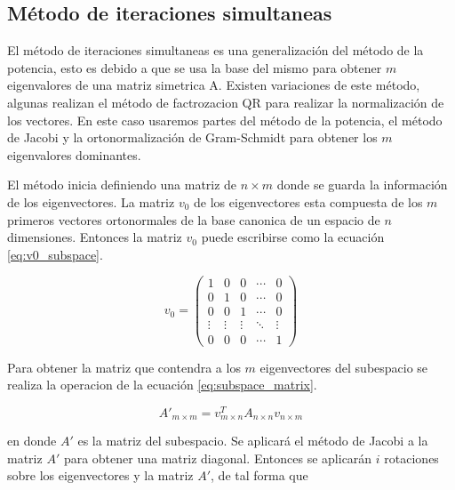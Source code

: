 \subsection{Método de iteraciones simultaneas}

El método de iteraciones simultaneas es una generalización del método de la potencia, esto es debido a que se usa la base del mismo para obtener $m$ eigenvalores de una matriz simetrica A. Existen variaciones de este método, algunas realizan el método de factrozacion QR para realizar la normalización de los vectores. En este caso usaremos partes del método de la potencia, el método de Jacobi y la ortonormalización de Gram-Schmidt para obtener los $m$ eigenvalores dominantes.

El método inicia definiendo una matriz de $n\times m$ donde se guarda la información de los eigenvectores. La matriz $v_0$ de los eigenvectores esta compuesta de los $m$ primeros vectores ortonormales de la base canonica de un espacio de $n$ dimensiones. Entonces la matriz $v_0$ puede escribirse como la ecuación \ref{eq:v0_subspace}.

\begin{equation}
    v_0 = \begin{pmatrix}
        1      & 0      & 0      & \cdots & 0                        \\
        0      & 1      & 0      & \cdots & 0                        \\
        0      & 0      & 1      & \cdots & 0                        \\
        \vdots & \vdots & \vdots & \ddots & \vdots                   \\
        0      & 0      & 0      & \cdots & 1 \label{eq:v0_subspace}
    \end{pmatrix}
\end{equation}

Para obtener la matriz que contendra a los $m$ eigenvectores del subespacio se realiza la operacion de la ecuación \ref{eq:subspace_matrix}.

\begin{equation}
    A'_{m\times m} = v^T_{m\times n} A_{n\times n} v_{n\times m} \label{eq:subspace_matrix}
\end{equation}

en donde $A'$ es la matriz del subespacio. Se aplicará el método de Jacobi a la matriz $A'$ para obtener una matriz diagonal. Entonces se aplicarán $i$ rotaciones sobre los eigenvectores y la matriz $A'$, de tal forma que

